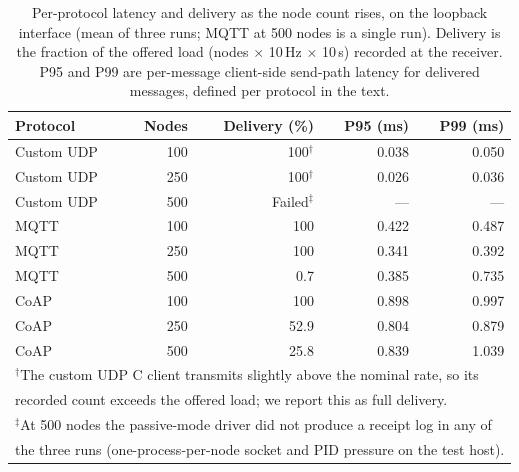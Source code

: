 \documentclass[jsan,article,submit,moreauthors,pdftex]{Definitions/mdpi}
\begin{document}
\begin{table}[H]
\centering
\caption{Per-protocol latency and delivery as the node count rises, on the loopback interface (mean of three runs; MQTT at 500 nodes is a single run). Delivery is the fraction of the offered load (nodes $\times$ 10\,Hz $\times$ 10\,s) recorded at the receiver. P95 and P99 are per-message client-side send-path latency for delivered messages, defined per protocol in the text.}
\label{tab:protocol-scale}
\small
\begin{tabular}{l r r r r}
\hline
\textbf{Protocol} & \textbf{Nodes} & \textbf{Delivery (\%)} & \textbf{P95 (ms)} & \textbf{P99 (ms)} \\
\hline
Custom UDP & 100 & 100$^{\dagger}$ & 0.038 & 0.050 \\
Custom UDP & 250 & 100$^{\dagger}$ & 0.026 & 0.036 \\
Custom UDP & 500 & Failed$^{\ddagger}$ & --- & --- \\
MQTT       & 100 & 100   & 0.422 & 0.487 \\
MQTT       & 250 & 100   & 0.341 & 0.392 \\
MQTT       & 500 & 0.7   & 0.385 & 0.735 \\
CoAP       & 100 & 100   & 0.898 & 0.997 \\
CoAP       & 250 & 52.9  & 0.804 & 0.879 \\
CoAP       & 500 & 25.8  & 0.839 & 1.039 \\
\hline
\multicolumn{5}{l}{\footnotesize{$^{\dagger}$The custom UDP C client transmits slightly above the nominal rate, so its}} \\
\multicolumn{5}{l}{\footnotesize{recorded count exceeds the offered load; we report this as full delivery.}} \\
\multicolumn{5}{l}{\footnotesize{$^{\ddagger}$At 500 nodes the passive-mode driver did not produce a receipt log in any of}} \\
\multicolumn{5}{l}{\footnotesize{the three runs (one-process-per-node socket and PID pressure on the test host).}} \\
\end{tabular}
\end{table}
\end{document}

